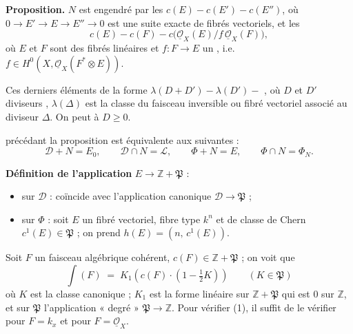 \documentclass[11pt,a4paper]{article}
\begin{document}
\textbf{Proposition.} $N$ est engendré par les $c(E) - c(E') - c(E'')$,
où $0 \to E' \to E \to E'' \to 0$ est une suite exacte de fibrés vectoriels, et les
\[
  c(E) - c(F) - c\bigl(\underline{\mathcal{O}}_{X}(E)/f\,\underline{\mathcal{O}}_{X}(F)\bigr),
\]
où $E$ et $F$ sont des fibrés linéaires et $f : F \to E$ un  , i.e.
$f \in H^{0}(X, \underline{\mathcal{O}}_{X}(F^{*} \otimes E))$.

Ces derniers éléments  de la forme
$\lambda(D + D') - \lambda(D') -{}$ \struck{\ill{}}, où $D$ et $D'$ diviseurs
\struck{\ill{}}, $\lambda(\Delta)$ est la classe du faisceau inversible ou
fibré vectoriel associé au diviseur $\Delta$. On peut  à
$D \geqslant 0$.

 précédant la proposition est équivalente aux suivantes :
\[
  \mathcal{D} + N = E_{0}, \qquad \mathcal{D} \cap N = \mathcal{L},
  \qquad \Phi + N = E, \qquad \Phi \cap N = \Phi_{N} .
\]


\textbf{Définition de l'application} $E \longrightarrow \mathbb{Z} + \mathfrak{P}$ :

\begin{itemize}
  \item sur $\mathcal{D}$ : coïncide avec l'application canonique
        $\mathcal{D} \to \mathfrak{P}$ ;
  \item sur $\Phi$ : soit $E$ un fibré vectoriel, fibre type
        $k^{n}$ et de classe de Chern $c^{1}(E) \in \mathfrak{P}$ ; on prend
        $h(E) = (n,\, c^{1}(E))$.
\end{itemize}

Soit $F$ un faisceau algébrique cohérent, $c(F) \in \mathbb{Z} + \mathfrak{P}$ ;
on voit que
\begin{equation*}
  \int(F) \;=\; K_{1}\!\left( c(F) \cdot \left(1 - \tfrac{1}{2}K\right) \right)
  \qquad (K \in \mathfrak{P}) \tag{1}
\end{equation*}
où $K$ est la classe canonique ; $K_{1}$ est la forme linéaire sur
$\mathbb{Z} + \mathfrak{P}$ qui est $0$ sur $\mathbb{Z}$, et sur $\mathfrak{P}$
l'application « degré » $\mathfrak{P} \to \mathbb{Z}$. Pour vérifier (1), il
suffit de le vérifier pour $F = k_{x}$ et pour $F = \underline{\mathcal{O}}_{X}$.
\end{document}
